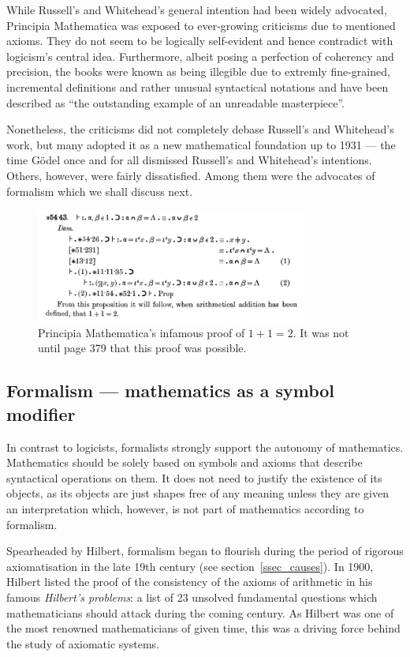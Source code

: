 \documentclass[hidelinks]{article}
\theoremstyle{plain}
\theoremstyle{definition}
\theoremstyle{rem}
\begin{document}
While Russell's and Whitehead's general intention had been widely advocated, Principia Mathematica was exposed to ever-growing criticisms due to mentioned axioms. They do not seem to be logically self-evident and hence contradict with logicism's central idea. Furthermore, albeit posing a perfection of coherency and precision, the books were known as being illegible due to extremly fine-grained, incremental definitions and rather unusual syntactical notations and have been described as ``the outstanding example of an unreadable masterpiece''\cite{math_experience}.

Nonetheless, the criticisms did not completely debase Russell's and Whitehead's work, but many adopted it as a new mathematical foundation up to 1931 --- the time Gödel once and for all dismissed Russell's and Whitehead's intentions. Others, however, were fairly dissatisfied. Among them were the advocates of formalism which we shall discuss next.

\begin{figure}[h]
	\centering
	\includegraphics[width=0.8\textwidth]{img/principia_mathematica.png}
	\caption{Principia Mathematica's infamous proof of $1+1=2$. It was not until page 379 that this proof was possible.}
\end{figure}

\subsection{Formalism --- mathematics as a symbol modifier}
In contrast to logicists, formalists strongly support the autonomy of mathematics. 
Mathematics should be solely based on symbols and axioms that describe syntactical operations on them. It does not need to justify the existence of its objects, as its objects are just shapes free of any meaning unless they are given an interpretation which, however, is not part of mathematics according to formalism.

Spearheaded by Hilbert, formalism began to flourish during the period of rigorous axiomatisation in the late 19th century (see section~\ref{ssec_causes}). 
In 1900, Hilbert listed the proof of the consistency of the axioms of arithmetic in his famous \textit{Hilbert's problems}: a list of 23 unsolved fundamental questions which mathematicians should attack during the coming century. As Hilbert was one of the most renowned mathematicians of given time, this was a driving force behind the study of axiomatic systems.
\end{document}

